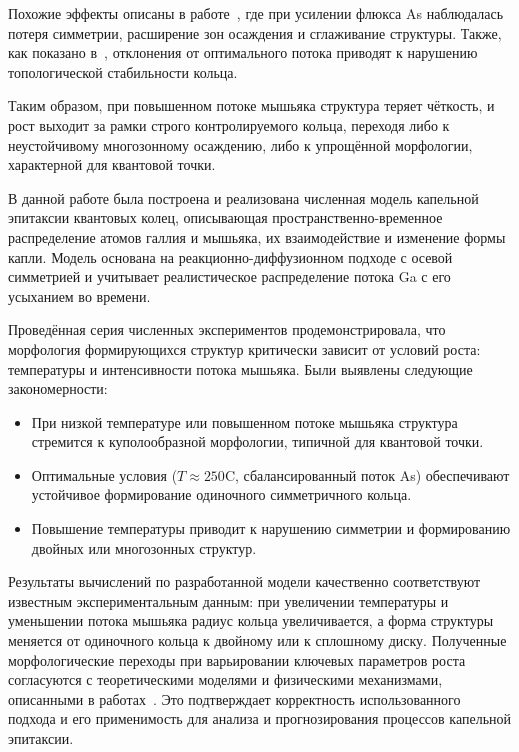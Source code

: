 \documentclass[14pt,oneside]{extarticle}
\begin{document}
Похожие эффекты описаны в работе~\cite{fan2023evaporation}, где при усилении флюкса As наблюдалась потеря симметрии, расширение зон осаждения и сглаживание структуры. Также, как показано в~\cite{mano2005nano}, отклонения от оптимального потока приводят к нарушению топологической стабильности кольца.

Таким образом, при повышенном потоке мышьяка структура теряет чёткость, и рост выходит за рамки строго контролируемого кольца, переходя либо к неустойчивому многозонному осаждению, либо к упрощённой морфологии, характерной для квантовой точки.

\pagebreak
{}

В данной работе была построена и реализована численная модель капельной эпитаксии квантовых колец, описывающая пространственно-временное распределение атомов галлия и мышьяка, их взаимодействие и изменение формы капли. Модель основана на реакционно-диффузионном подходе с осевой симметрией и учитывает реалистическое распределение потока Ga с его усыханием во времени.

Проведённая серия численных экспериментов продемонстрировала, что морфология формирующихся структур критически зависит от условий роста: температуры и интенсивности потока мышьяка. Были выявлены следующие закономерности:

\begin{itemize}
    \item При низкой температуре или повышенном потоке мышьяка структура стремится к куполообразной морфологии, типичной для квантовой точки.
    \item Оптимальные условия ($T \approx 250$\textdegree C, сбалансированный поток As) обеспечивают устойчивое формирование одиночного симметричного кольца.
    \item Повышение температуры приводит к нарушению симметрии и формированию двойных или многозонных структур.
\end{itemize}

Результаты вычислений по разработанной модели качественно соответствуют известным экспериментальным данным: при увеличении температуры и уменьшении потока мышьяка радиус кольца увеличивается, а форма структуры меняется от одиночного кольца к двойному или к сплошному диску. Полученные морфологические переходы при варьировании ключевых параметров роста согласуются с теоретическими моделями и физическими механизмами, описанными в работах~\cite{zhou2013,mano2005nano,fan2023evaporation}. Это подтверждает корректность использованного подхода и его применимость для анализа и прогнозирования процессов капельной эпитаксии.
\end{document}
